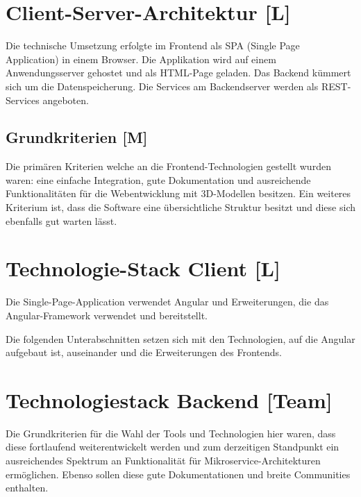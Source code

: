 \section{Client-Server-Architektur [L]}
Die technische Umsetzung erfolgte im Frontend als SPA (Single Page Application) in einem Browser. Die Applikation wird auf einem Anwendungsserver gehostet und als HTML-Page geladen. Das Backend kümmert sich um die Datenspeicherung. Die Services am Backendserver werden als REST-Services angeboten.

\subsection{Grundkriterien [M]} 
Die primären Kriterien welche an die Frontend-Technologien gestellt wurden waren: eine einfache Integration, gute Dokumentation und ausreichende Funktionalitäten für die Webentwicklung mit 3D-Modellen besitzen. Ein weiteres Kriterium ist, dass die Software eine übersichtliche Struktur besitzt und diese sich ebenfalls gut warten lässt. 

  

\section{Technologie-Stack Client [L]}
Die Single-Page-Application verwendet Angular und Erweiterungen, die das Angular-Framework verwendet und bereitstellt.

Die folgenden Unterabschnitten setzen sich mit den Technologien, auf die Angular aufgebaut ist, auseinander und die Erweiterungen des Frontends.





\section{Technologiestack Backend [Team]}
Die Grundkriterien für die Wahl der Tools und Technologien hier waren, dass diese fortlaufend weiterentwickelt werden und zum derzeitigen Standpunkt ein ausreichendes Spektrum an Funktionalität für Mikroservice-Architekturen ermöglichen.\cite{MicroserviceAbout} Ebenso sollen diese gute Dokumentationen und breite Communities enthalten. 



